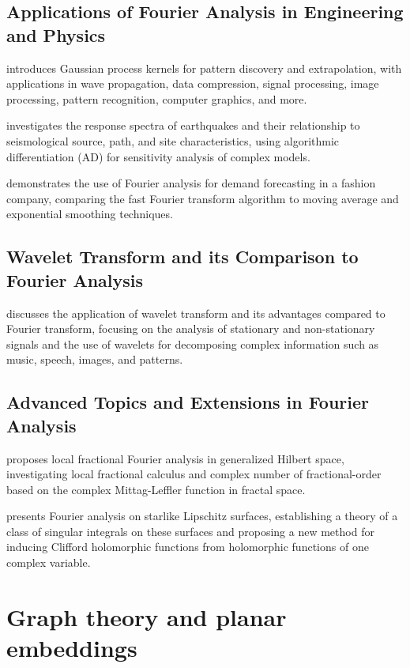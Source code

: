 \documentclass{article}
\begin{document}
\subsection{Applications of Fourier Analysis in Engineering and Physics}

\cite{Wilson2013GaussianPK} introduces Gaussian process kernels for pattern discovery and extrapolation, with applications in wave propagation, data compression, signal processing, image processing, pattern recognition, computer graphics, and more.

\cite{Salvado2005BulletinOT} investigates the response spectra of earthquakes and their relationship to seismological source, path, and site characteristics, using algorithmic differentiation (AD) for sensitivity analysis of complex models.

\cite{Fumi2013FourierAF} demonstrates the use of Fourier analysis for demand forecasting in a fashion company, comparing the fast Fourier transform algorithm to moving average and exponential smoothing techniques.

\subsection{Wavelet Transform and its Comparison to Fourier Analysis}

\cite{Nasih2016ApplicationOW} discusses the application of wavelet transform and its advantages compared to Fourier transform, focusing on the analysis of stationary and non-stationary signals and the use of wavelets for decomposing complex information such as music, speech, images, and patterns.

\subsection{Advanced Topics and Extensions in Fourier Analysis}

\cite{Yang2012LocalFF} proposes local fractional Fourier analysis in generalized Hilbert space, investigating local fractional calculus and complex number of fractional-order based on the complex Mittag-Leffler function in fractal space.

\cite{Qian2001FourierAO} presents Fourier analysis on starlike Lipschitz surfaces, establishing a theory of a class of singular integrals on these surfaces and proposing a new method for inducing Clifford holomorphic functions from holomorphic functions of one complex variable.


\section{Graph theory and planar embeddings}
\end{document}

